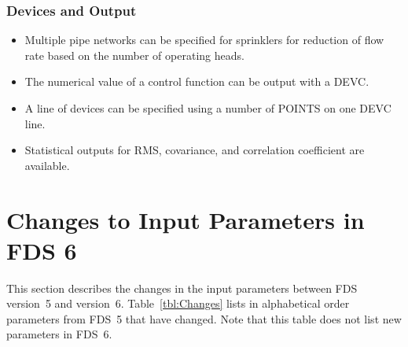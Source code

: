 \documentclass[11pt]{book}
\begin{document}
\subsubsection{Devices and Output}

    \begin{itemize}
    \item Multiple pipe networks can be specified for sprinklers for reduction of flow rate based on the number of operating heads.
    \item The numerical value of a control function can be output with a {\ct DEVC}.
    \item A line of devices can be specified using a number of {\ct POINTS} on one {\ct DEVC} line.
    \item Statistical outputs for RMS, covariance, and correlation coefficient are available.
    \end{itemize}





\section{Changes to Input Parameters in FDS 6}

This section describes the changes in the input parameters between FDS version~5 and version~6. Table~\ref{tbl:Changes} lists in alphabetical order parameters from FDS~5 that have changed. Note that this table does not list new parameters in FDS~6.
\end{document}
